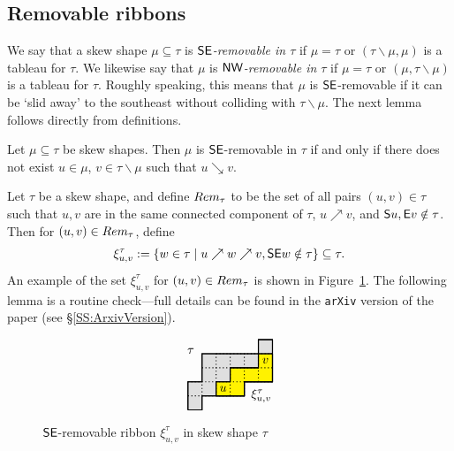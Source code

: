 \documentclass[Unicode,ALCO]{cedram}
\newcommand{\0}{{\bar 0}}
\newcommand{\so}{{\sf S}}
\newcommand{\ea}{{\sf E}}
\newcommand{\nnww}{{\sf NW}}
\newcommand{\ssee}{{\sf SE}}
\newcommand{\hackcenter}[1]{
 \xy (0,0)*{#1}; \endxy}
\begin{document}
\subsection{Removable ribbons}
We say that a skew shape \(\mu \subseteq \tau\) is {\em \(\ssee\)-removable in \(\tau\)} if \(\mu = \tau\) or \((\tau\backslash\mu, \mu)\) is a tableau for \(\tau\). We likewise say that \(\mu\) is {\em \(\nnww\)-removable in \(\tau\)} if \(\mu = \tau\) or \((\mu,\tau\backslash\mu)\) is a tableau for \(\tau\).
Roughly speaking, this means that \(\mu\) is \(\ssee\)-removable if it can be `slid away' to the southeast without colliding with \(\tau\backslash\mu\).
The next lemma follows directly from definitions.
\begin{lemma}\label{remcond}
Let \(\mu \subseteq \tau\) be skew shapes. Then \(\mu\) is \(\ssee\)-removable in \(\tau\) if and only if there does not exist \(u \in \mu\), \(v \in \tau\backslash \mu\) such that \(u \searrow v\). 
\end{lemma}

Let \(\tau\) be a skew shape, and define \(\textup{Rem}_\tau\) to be the set of all pairs \((u,v) \in \tau\) such that
\(u,v\) are in the same connected component of \(\tau\), \(u \nearrow v\), and \(\so u, \ea v \notin \tau\).
Then for \((u,v) \in \textup{Rem}_\tau\), define 
\begin{align*}
\xi^\tau_{u,v} := \{w \in \tau \mid u \nearrow w \nearrow v, \ssee w \notin \tau\} \subseteq \tau.
\end{align*}
An example of the set \(\xi^\tau_{u,v}\) for \((u,v) \in \textup{Rem}_\tau\) is shown in Figure~\ref{fig:xiuvex}. The following lemma is a routine check---full details can be found in the \texttt{arXiv} version of the paper (see \S\ref{SS:ArxivVersion}). 


\begin{figure}
\begin{align*}
{}
\hackcenter{
\begin{tikzpicture}[scale=0.4]
\draw[thick, fill=lightgray!50]   (0,-1)--(1,-1)--(1,0)--(4,0)--(4,1)--(6,1)--(6,4)--(5,4)--(5,3)--(1,3)--(1,2)--(1,1)--(0,1)--(0,-1);
\draw[thick, fill=yellow] (2,0)--(4,0)--(4,1)--(6,1)--(6,3)--(5,3)--(5,2)--(3,2)--(3,1)--(2,1)--(2,0);
\draw[thick, dotted] (1,0)--(1,1);
\draw[thick, dotted] (2,0)--(2,3);
\draw[thick, dotted] (3,0)--(3,3);
\draw[thick, dotted] (4,0)--(4,3);
\draw[thick, dotted] (5,1)--(5,3);
\draw[thick, dotted] (0,0)--(4,0);
\draw[thick, dotted] (0,1)--(6,1);
\draw[thick, dotted] (1,2)--(6,2);
\draw[thick, dotted] (2,3)--(6,3);
\draw[thick]   (0,-1)--(1,-1)--(1,0)--(4,0)--(4,1)--(6,1)--(6,4)--(5,4)--(5,3)--(1,3)--(1,2)--(1,1)--(0,1)--(0,-1);
\draw[thick] (2,0)--(4,0)--(4,1)--(6,1)--(6,3)--(5,3)--(5,2)--(3,2)--(3,1)--(2,1)--(2,0);
\node at (0.2,3.2){ $\tau$};
\node at (5.2,0){ $\xi_{u,v}^\tau$};
\node at (2.5,0.5){ $u$};
\node at (5.5,2.5){ $v$};
\end{tikzpicture}
}
\end{align*}
\caption{\(\ssee\)-removable ribbon \(\xi^\tau_{u,v}\) in skew shape \(\tau\)}
\label{fig:xiuvex}       
\end{figure}
\end{document}
